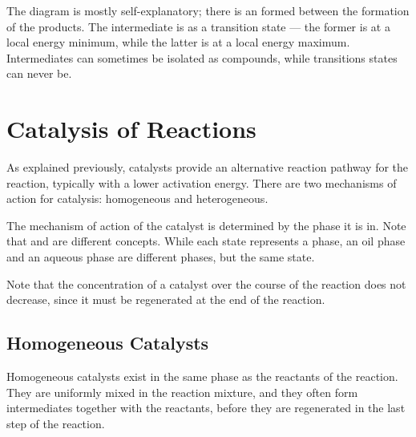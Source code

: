 				The diagram is mostly self-explanatory; there is an  formed between the formation of the products.
				The intermediate is  as a transition state --- the former is at a local energy minimum, while the latter
				is at a local energy maximum. Intermediates can sometimes be isolated as compounds, while transitions states can never be.






	\pagebreak
	\section{Catalysis of Reactions}

		As explained previously, catalysts provide an alternative reaction pathway for the reaction, typically with a lower activation energy.
		There are two mechanisms of action for catalysis: homogeneous and heterogeneous.

		The mechanism of action of the catalyst is determined by the phase it is in. Note that  and  are
		different concepts. While each state represents a phase, an oil phase and an aqueous phase are different phases, but the same state.

		Note that the concentration of a catalyst over the course of the reaction does not decrease, since it must be regenerated at the end of
		the reaction.


		\subsection{Homogeneous Catalysts}

			Homogeneous catalysts exist in the same phase as the reactants of the reaction. They are uniformly mixed in the reaction mixture,
			and they often form intermediates together with the reactants, before they are regenerated in the last step of the reaction.


